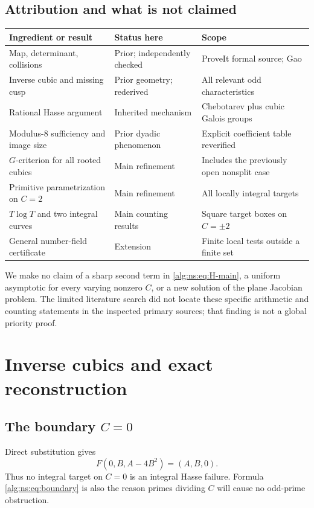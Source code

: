 \documentclass[11pt]{article}
\numberwithin{equation}{section}
\theoremstyle{plain}
\theoremstyle{plain}
\theoremstyle{plain}
\theoremstyle{definition}
\theoremstyle{definition}
\theoremstyle{definition}
\theoremstyle{remark}
\begin{document}
\subsection{Attribution and what is not claimed}
\begin{center}\small
\begin{tabular}{@{}p{}p{}p{}@{}}
\toprule
Ingredient or result & Status here & Scope\\
\midrule
Map, determinant, collisions & Prior; independently checked & ProveIt formal source; Gao\\
Inverse cubic and missing cusp & Prior geometry; rederived & All relevant odd characteristics\\
Rational Hasse argument & Inherited mechanism & Chebotarev plus cubic Galois groups\\
Modulus-$8$ sufficiency and image size & Prior dyadic phenomenon & Explicit coefficient table reverified\\
$G$-criterion for all rooted cubics & Main refinement & Includes the previously open nonsplit case\\
Primitive parametrization on $C=2$ & Main refinement & All locally integral targets\\
$T\log T$ and two integral curves & Main counting results & Square target boxes on $C=\pm2$\\
General number-field certificate & Extension & Finite local tests outside a finite set\\
\bottomrule
\end{tabular}
\end{center}
We make no claim of a sharp second term in \eqref{alg:ns:eq:H-main}, a uniform
asymptotic for every varying nonzero $C$, or a new solution of the plane
Jacobian problem. The limited literature search did not locate these
specific arithmetic and counting statements in the inspected primary
sources; that finding is not a global priority proof.

\section{Inverse cubics and exact reconstruction}\label{alg:ns:sec:inverse}

\subsection{The boundary \texorpdfstring{$C=0$}{C=0}}
Direct substitution gives
\begin{equation}\label{alg:ns:eq:boundary}
F(0,B,A-4B^2)=(A,B,0).
\end{equation}
Thus no integral target on $C=0$ is an integral Hasse failure. Formula
\eqref{alg:ns:eq:boundary} is also the reason primes dividing $C$ will cause no
odd-prime obstruction.
\end{document}
